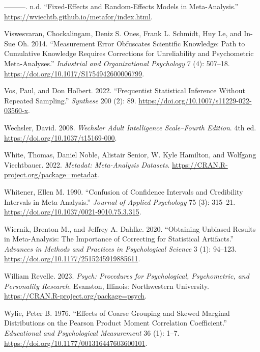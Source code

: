\documentclass[
  letterpaper,
  DIV=11,
  numbers=noendperiod]{scrreprt}
\newlength{\cslhangindent}
\newlength{\cslentryspacingunit} %
\newenvironment{CSLReferences}[2] %
 {%
  \setlength{\parindent}{0pt}
  \ifodd #1
  \let\oldpar\par
  \def\par{\hangindent=\cslhangindent\oldpar}
  \fi
  \setlength{\parskip}{#2\cslentryspacingunit}
 }%
 {}
\begin{document}
\begin{CSLReferences}{1}{0}
\leavevmode{}%
---------. n.d. {``Fixed-Effects and Random-Effects Models in
Meta-Analysis.''} \url{https://wviechtb.github.io/metafor/index.html}.

\leavevmode{}%
Viswesvaran, Chockalingam, Deniz S. Ones, Frank L. Schmidt, Huy Le, and
In-Sue Oh. 2014. {``Measurement Error Obfuscates Scientific Knowledge:
Path to Cumulative Knowledge Requires Corrections for Unreliability and
Psychometric Meta-Analyses.''} \emph{Industrial and Organizational
Psychology} 7 (4): 507--18.
\url{https://doi.org/10.1017/S1754942600006799}.

\leavevmode{}%
Vos, Paul, and Don Holbert. 2022. {``Frequentist Statistical Inference
Without Repeated Sampling.''} \emph{Synthese} 200 (2): 89.
\url{https://doi.org/10.1007/s11229-022-03560-x}.

\leavevmode{}%
Wechsler, David. 2008. \emph{Wechsler Adult Intelligence Scale--Fourth
Edition}. 4th ed. \url{https://doi.org/10.1037/t15169-000}.

\leavevmode{}%
White, Thomas, Daniel Noble, Alistair Senior, W. Kyle Hamilton, and
Wolfgang Viechtbauer. 2022. \emph{Metadat: Meta-Analysis Datasets}.
\url{https://CRAN.R-project.org/package=metadat}.

\leavevmode{}%
Whitener, Ellen M. 1990. {``Confusion of Confidence Intervals and
Credibility Intervals in Meta-Analysis.''} \emph{Journal of Applied
Psychology} 75 (3): 315--21.
\url{https://doi.org/10.1037/0021-9010.75.3.315}.

\leavevmode{}%
Wiernik, Brenton M., and Jeffrey A. Dahlke. 2020. {``Obtaining Unbiased
Results in Meta-Analysis: The Importance of Correcting for Statistical
Artifacts.''} \emph{Advances in Methods and Practices in Psychological
Science} 3 (1): 94--123. \url{https://doi.org/10.1177/2515245919885611}.

\leavevmode{}%
William Revelle. 2023. \emph{Psych: Procedures for Psychological,
Psychometric, and Personality Research}. Evanston, Illinois:
Northwestern University. \url{https://CRAN.R-project.org/package=psych}.

\leavevmode{}%
Wylie, Peter B. 1976. {``Effects of Coarse Grouping and Skewed Marginal
Distributions on the Pearson Product Moment Correlation Coefficient.''}
\emph{Educational and Psychological Measurement} 36 (1): 1--7.
\url{https://doi.org/10.1177/001316447603600101}.

\end{CSLReferences}
\end{document}
